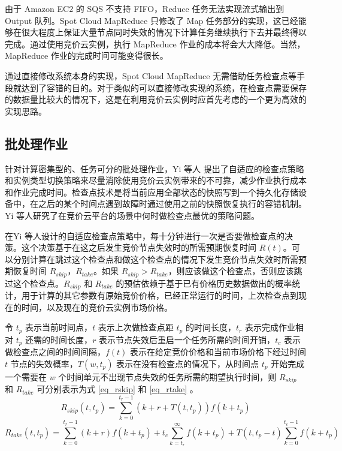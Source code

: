 由于 Amazon EC2 的 SQS 不支持 FIFO，Reduce 任务无法实现流式输出到 Output 队列。Spot Cloud MapReduce 只修改了 Map 任务部分的实现，这已经能够在很大程度上保证大量节点同时失效的情况下计算任务继续执行下去并最终得以完成。通过使用竞价云实例，执行 MapReduce 作业的成本将会大大降低。当然，MapReduce 作业的完成时间可能变得很长。

通过直接修改系统本身的实现，Spot Cloud MapReduce 无需借助任务检查点等手段就达到了容错的目的。对于类似的可以直接修改实现的系统，在检查点需要保存的数据量比较大的情况下，这是在利用竞价云实例时应首先考虑的一个更为高效的实现思路。

\subsection{批处理作业}
针对计算密集型的、任务可分的批处理作业，Yi 等人 \cite{Yi:2010:RCS:1844768.1845343, 5975137} 提出了自适应的检查点策略和实例类型切换策略来尽量消除使用竞价云实例带来的不可靠，减少作业执行成本和作业完成时间。检查点技术是将当前应用全部状态的快照写到一个持久化存储设备中，在之后的某个时间点遇到故障时通过使用之前的快照恢复执行的容错机制。Yi 等人研究了在竞价云平台的场景中何时做检查点最优的策略问题。

在Yi 等人设计的自适应检查点策略中，每十分钟进行一次是否要做检查点的决策。这个决策基于在这之后发生竞价节点失效时的所需预期恢复时间 $R(t)$。可以分别计算在跳过这个检查点和做这个检查点的情况下发生竞价节点失效时所需预期恢复时间 $R_{skip}$，$R_{take}$。如果 $R_{skip} > R_{take}$，则应该做这个检查点，否则应该跳过这个检查点。$R_{skip}$ 和 $R_{take}$ 的预估依赖于基于已有价格历史数据做出的概率统计，用于计算的其它参数有原始竞价价格，已经正常运行的时间，上次检查点到现在的时间，以及现在的竞价云实例市场价格。

令 $t_p$ 表示当前时间点，$t$ 表示上次做检查点距 $t_p$ 的时间长度，$t_r$ 表示完成作业相对 $t_p$ 还需的时间长度，$r$ 表示节点失效后重启一个任务所需的时间开销，$t_c$ 表示做检查点之间的时间间隔，$f(t)$ 表示在给定竞价价格和当前市场价格下经过时间 $t$ 节点的失效概率，$T(w, t_p)$ 表示在没有检查点的情况下，从时间点 $t_p$ 开始完成一个需要在 $w$ 个时间单元不出现节点失效的任务所需的期望执行时间，则 $R_{skip}$ 和 $R_{take}$ 可分别表示为式 \eqref{eq_rskip} 和 \eqref{eq_rtake} 。
\begin{equation}\label{eq_rskip} 
R_{skip}(t, t_p) = \sum_{k=0}^{t_r - 1}(k + r + T(t,t_p))f(k+t_p)
\end{equation}
\begin{equation}\label{eq_rtake} 
R_{take}(t, t_p) = \sum_{k=0}^{t_r - 1}(k + r)f(k+t_p) + t_c\sum_{k=t_r}^{\infty}f(k+t_p)+T(t,t_p-t)\sum_{k=0}^{t_c - 1}f(k+t_p)
\end{equation}

